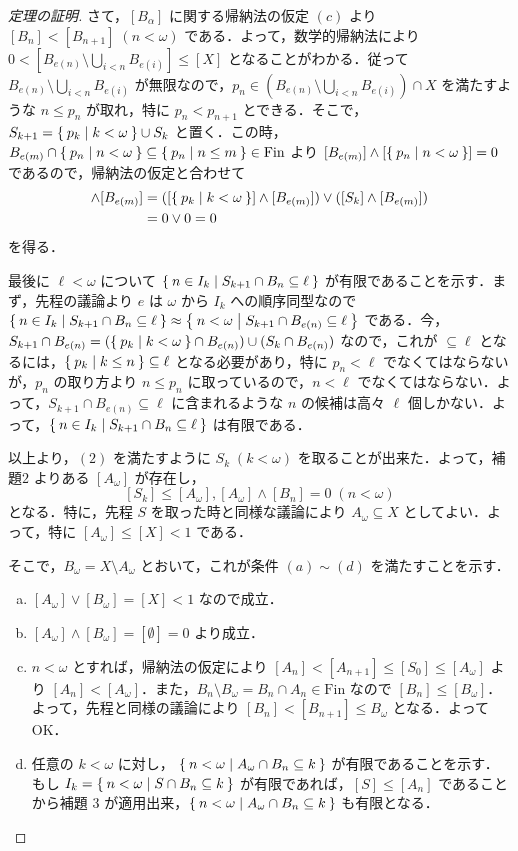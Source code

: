 \documentclass[a4j,uplatex]{jsarticle}
\newcommand{\Fin}{\mathrm{Fin}}
\begin{document}
\begin{proof}[定理の証明]
 さて，$[B_\alpha]$ に関する帰納法の仮定 $(c)$ より $[B_n] < [B_{n+1}] \; (n < \omega)$ である．よって，数学的帰納法により $0 < [B_{e(n)} \setminus \bigcup_{i < n} B_{e(i)}] \leq [X]$ となることがわかる．従って $B_{e(n)} \setminus \bigcup_{i < n} B_{e(i)}$ が無限なので，$p_n \in (B_{e(n)} \setminus \bigcup_{i<n} B_{e(i)}) \cap X$ を満たすような $n \leq p_n$ が取れ，特に $p_n < p_{n+1}$ とできる．そこで，$S_{k+1} = \Set{p_k | k < \omega} \cup S_k$ と置く．この時，$B_{e(m)} \cap \Set{ p_n | n < \omega} \subseteq \Set{ p_n | n \leq m } \in \Fin$ より $[B_{e(m)}] \wedge [\Set{ p_n | n < \omega}] = 0$ であるので，帰納法の仮定と合わせて
 \begin{align*}
  [S_{k+1}] \wedge [B_{e(m)}] &= ([\Set{p_k | k < \omega}] \wedge [B_{e(m)}]) \vee ([S_k] \wedge [B_{e(m)}])\\
  &= 0 \vee 0 = 0 
 \end{align*}
 を得る．

 最後に $\ell < \omega$ について $\Set{n \in I_k | S_{k+1} \cap B_n \subseteq \ell}$ が有限であることを示す．まず，先程の議論より $e$ は $\omega$ から $I_k$ への順序同型なので $\Set{ n \in I_k | S_{k+1} \cap B_n \subseteq \ell} \approx \Set{ n < \omega | S_{k+1} \cap B_{e(n)} \subseteq \ell}$ である．今，$S_{k+1} \cap B_{e(n)} = (\Set{p_k | k < \omega} \cap B_{e(n)}) \cup (S_k \cap B_{e(n)})$ なので，これが $\subseteq \ell$ となるには，$\Set{p_k | k \leq n} \subseteq \ell$ となる必要があり，特に $p_n < \ell$ でなくてはならないが，$p_n$ の取り方より $n \leq p_n$ に取っているので，$n < \ell$ でなくてはならない．よって，$S_{k+1} \cap B_{e(n)} \subseteq \ell$ に含まれるような $n$ の候補は高々 $\ell$ 個しかない．よって，$\Set{ n \in I_k | S_{k+1} \cap B_n \subseteq \ell}$ は有限である．

 以上より，$(2)$ を満たすように $S_k \; (k < \omega)$ を取ることが出来た．よって，補題$2$ よりある $[A_\omega]$ が存在し，
 \[
  [S_k] \leq [A_\omega], [A_\omega] \wedge [B_n] = 0 \; (n < \omega)
 \]
 となる．特に，先程 $S$ を取った時と同様な議論により $A_\omega \subseteq X$ としてよい．よって，特に $[A_\omega] \leq [X] < 1 $ である．

 そこで，$B_\omega = X \setminus A_\omega$ とおいて，これが条件 $(a) \sim (d)$ を満たすことを示す．

 \begin{enumerate}[(a)]
  \item $[A_\omega] \vee [B_\omega] = [X] < 1$ なので成立．
  \item $[A_\omega] \wedge [B_\omega] = [\emptyset] = 0$ より成立．
  \item $n < \omega$ とすれば，帰納法の仮定により $[A_n] < [A_{n+1}] \leq [S_0] \leq [A_\omega]$ より $[A_n] < [A_\omega]$．また，$B_n \setminus B_\omega = B_n \cap A_n \in \Fin$ なので $[B_n] \leq [B_\omega]$．よって，先程と同様の議論により $[B_n] < [B_{n+1}] \leq B_\omega$ となる．よって OK．
  \item 任意の $k < \omega$ に対し， $\Set{n < \omega | A_\omega \cap B_n \subseteq k}$ が有限であることを示す．もし $I_k = \Set{ n < \omega | S \cap B_n \subseteq k}$ が有限であれば，$[S] \leq [A_n]$ であることから補題 $3$ が適用出来，$\Set{ n < \omega | A_\omega \cap B_n \subseteq k }$ も有限となる．


\end{enumerate}
\end{proof}
\end{document}
